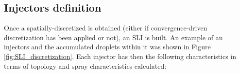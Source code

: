 %
%
%
%	
%	
%	
%	
%		
%	
%



\subsection{Injectors definition}
\label{subsec:ch4_injectors_definition}

Once a spatially-discretized is obtained (either if convergence-driven discretization has been applied or not), an SLI is built. An example of an injectors and the accumulated droplets within it was shown in Figure \ref{fig:SLI_discretization}. Each injector has then the following characteristics in terms of topology and spray characteristics calculated:

